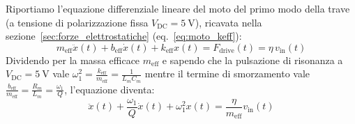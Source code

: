 \documentclass[11pt,a4paper]{article}
\begin{document}
Riportiamo l'equazione differenziale lineare del moto del primo modo della trave (a tensione di polarizzazione fissa $V_{\text{DC}} = \SI{5}{\volt}$), ricavata nella sezione~\ref{sec:forze_elettrostatiche} (eq.~\eqref{eq:moto_keff}):
\begin{equation}
    \label{eq:moto_base_decay}
    m_{\text{eff}} \ddot{x}(t) + b_{\text{eff}} \dot{x}(t) + k_{\text{eff}} x(t) = F_{\text{drive}}(t) = \eta \, v_{\text{in}}(t)
\end{equation}
Dividendo per la massa efficace $m_{\text{eff}}$ e sapendo che la pulsazione di risonanza a $V_{\text{DC}} = \SI{5}{\volt}$ vale $\omega_1^2 = \frac{k_{\text{eff}}}{m_{\text{eff}}} = \frac{1}{L_m C_m}$ mentre il termine di smorzamento vale $\frac{b_{\text{eff}}}{m_{\text{eff}}} = \frac{R_m}{L_m} = \frac{\omega_1}{Q}$, l'equazione diventa:
\begin{equation}
    \label{eq:ode_canonica_decay}
    \ddot{x}(t) + \frac{\omega_1}{Q} \dot{x}(t) + \omega_1^2 x(t) = \frac{\eta}{m_{\text{eff}}} v_{\text{in}}(t)
\end{equation}
\end{document}
